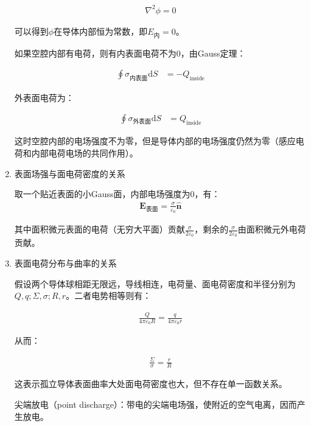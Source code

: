 \documentclass[12pt,onecolumn,a4paper]{book}
\numberwithin{table}{subsection}
\numberwithin{equation}{subsection}
\begin{document}
\begin{enumerate}
          \begin{align}
              \nabla^2 \phi = 0
          \end{align}

          可以得到$\phi$在导体内部恒为常数，即$E_\text{内}=0$。

          如果空腔内部有电荷，则有内表面电荷不为0，由Gauss定理：

          \begin{align}
              \oint \sigma_\text{内表面} \mathrm{d} S & = - Q_\text{inside}
          \end{align}

          外表面电荷为：

          \begin{align}
              \oint \sigma_\text{外表面} \mathrm{d} S & = Q_\text{inside}
          \end{align}

          这时空腔内部的电场强度不为零，但是导体内部的电场强度仍然为零（感应电荷和内部电荷电场的共同作用）。

    \item 表面场强与面电荷密度的关系

          取一个贴近表面的小Gauss面，内部电场强度为0，有：
          \begin{align}
              \mathbf{E}_\text{表面} = \frac{\sigma}{\varepsilon_0}\hat{\mathbf{n}}
          \end{align}

          其中面积微元表面的电荷（无穷大平面）贡献$\frac{\sigma}{2\varepsilon_0}$，剩余的$\frac{\sigma}{2\varepsilon_0}$由面积微元外电荷贡献。

    \item 表面电荷分布与曲率的关系

          假设两个导体球相距无限远，导线相连，电荷量、面电荷密度和半径分别为$Q,q;\Sigma,\sigma;R,r$。二者电势相等则有：

          \begin{align}
              \frac{Q}{4\pi\varepsilon_0 R} = \frac{q}{4\pi\varepsilon_0 r}
          \end{align}

          从而：

          \begin{align}
              \frac{\Sigma}{\sigma} = \frac{r}{R}
          \end{align}

          这表示孤立导体表面曲率大处面电荷密度也大，但不存在单一函数关系。

          尖端放电（point discharge）：带电的尖端电场强，使附近的空气电离，因而产生放电。
\end{enumerate}
\end{document}
